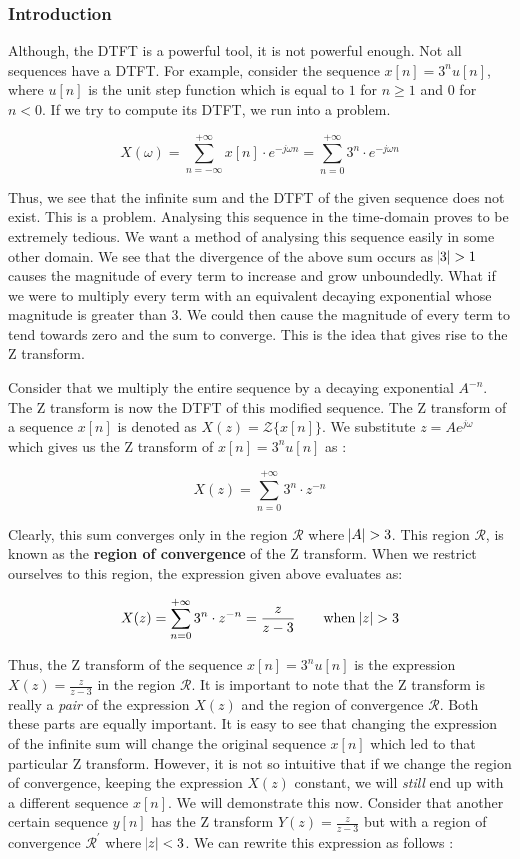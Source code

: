 \documentclass{article}
\theoremstyle{definition}
\begin{document}
\subsubsection{Introduction}
Although, the DTFT is a powerful tool, it is not powerful enough. Not all sequences have a DTFT. For example, consider the sequence $x[n] = 3^n u[n]$, where $u[n]$ is the unit step function which is equal to $1$ for $n\geq 1$ and $0$ for $n<0$. If we try to compute its DTFT, we run into a problem. 

\[
	X(\omega) = \sum_{n=-\infty}^{+\infty} x[n] \cdot e^{-j\omega n} = \sum_{n=0}^{+\infty} 3^n \cdot e^{-j\omega n}
\]

Thus, we see that the infinite sum and the DTFT of the given sequence does not exist. This is a problem. Analysing this sequence in the time-domain proves to be extremely tedious. We want a method of analysing this sequence easily in some other domain. We see that the divergence of the above sum occurs as $\abs{3} >1$ causes the magnitude of every term to increase and grow unboundedly. What if we were to multiply every term with an equivalent decaying exponential whose magnitude is greater than $3$. We could then cause the magnitude of every term to tend towards zero and the sum to converge. This is the idea that gives rise to the Z transform.  \smallskip

Consider that we multiply the entire sequence by a decaying exponential $A^{-n}$. The Z transform is now the DTFT of this modified sequence. The Z transform of a sequence $x[n]$ is denoted as $X(z) = \mathcal{Z} \{ x[n] \}$. We substitute $z = A e^{j\omega}$ which gives us the Z transform of $x[n] = 3^n u[n]$ as :

\[
	X(z) = \sum_{n=0}^{+\infty} 3^n \cdot z^{-n}
\]

Clearly, this sum converges only in the region $\mathcal{R}$ where $\abs{A} > 3$. This region $\mathcal{R}$, is known as the \textbf{region of convergence} of the Z transform. When we restrict ourselves to this region, the expression given above evaluates as:

\[
	X(z) = \sum_{n=0}^{+\infty} 3^n \cdot z^{-n} = \frac{z}{z-3} \quad \quad \text{when} \: \abs{z} > 3
\]

Thus, the Z transform of the sequence $x[n] = 3^nu[n]$ is the expression $X(z) = \frac{z}{z-3}$ in the region $\mathcal{R}$. It is important to note that the Z transform is really a \textit{pair} of the expression $X(z)$ and the region of convergence $\mathcal{R}$. Both these parts are equally important. It is easy to see that changing the expression of the infinite sum will change the original sequence $x[n]$ which led to that particular Z transform. However, it is not so intuitive that if we change the region of convergence, keeping the expression $X(z)$ constant, we will \textit{still} end up with a different sequence $x[n]$. We will demonstrate this now. Consider that another certain sequence $y[n]$ has the Z transform $Y(z) = \frac{z}{z-3}$ but with a region of convergence $\mathcal{R}^{'}$ where $\abs{z} < 3$. We can rewrite this expression as follows : 
\end{document}
